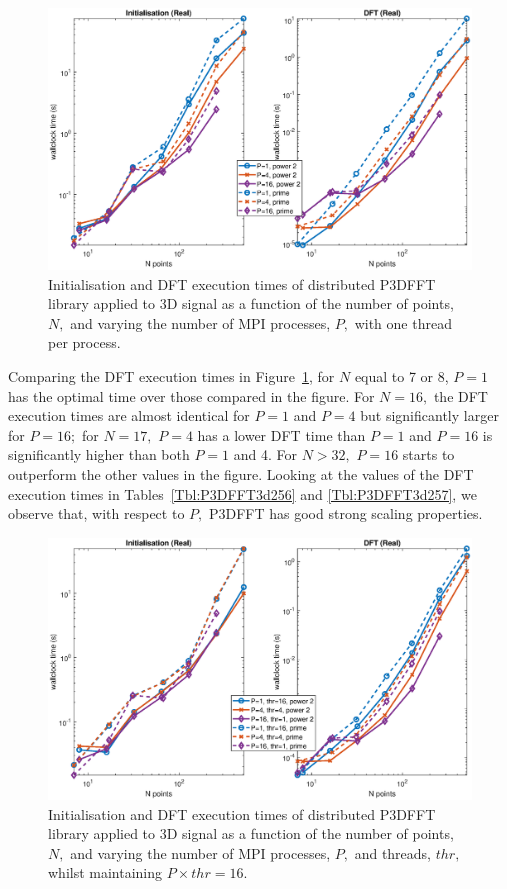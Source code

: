 \documentclass[a4paper]{article}
\begin{document}
\begin{figure}[htb]
    \centering
    \includegraphics[width=0.9\linewidth]{../results/p3dfft_3d_mpi.eps}
  \caption{Initialisation and DFT execution times of distributed P3DFFT library applied to 3D signal as a function of the
    number of points, $N,$ and varying the number of MPI processes, $P,$ with one thread per process.}
  \label{3DDistP3DFFT}
\end{figure}

Comparing the DFT execution times in Figure~\ref{3DDistP3DFFT}, for
$N$ equal to 7 or 8, $P=1$ has the optimal time over those compared in
the figure. For $N=16,$ the DFT execution times are almost identical
for $P=1$ and $P=4$ but significantly larger for $P=16;$ for $N=17,$
$P=4$ has a lower DFT time than $P=1$ and $P=16$ is significantly
higher than both $P=1$ and 4. For $N>32,$ $P=16$ starts to outperform
the other values in the figure. Looking at the values of the DFT
execution times in Tables~\ref{Tbl:P3DFFT3d256} and
\ref{Tbl:P3DFFT3d257}, we observe that, with respect to $P,$ P3DFFT
has good strong scaling properties.

\begin{figure}[htb]
    \centering
    \includegraphics[width=0.9\linewidth]{../results/p3dfft_3d_mpi_thr.eps}
  \caption{Initialisation and DFT execution times of distributed P3DFFT library applied to 3D signal as a function of the
    number of points, $N,$ and varying the number of MPI processes, $P,$ and threads, $thr,$ whilst maintaining $P\times thr=16.$}
  \label{3DDistP3DFFT16}
\end{figure}
\end{document}
